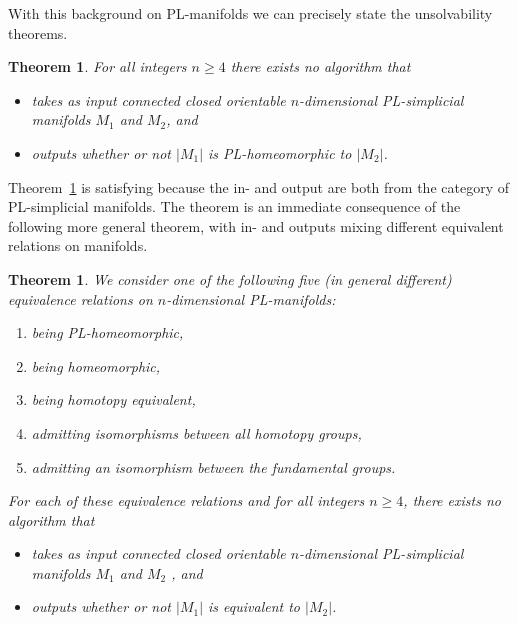 \documentclass[a4paper, reqno]{amsart}
\newtheorem{theorem}[proposition]{Theorem}
\theoremstyle{definition}
\theoremstyle{remark}
\newcommand{\comm}[2]{%
  {\color{red}#1: #2}}
\renewcommand{\~}{\nobreak\ }
\begin{document}
With this background on PL-manifolds we can precisely state the unsolvability theorems.

\begin{theorem}
\label{thm:main_PL_input_and_output}
For all integers $n\geq4$ there exists no algorithm that 
\begin{itemize}
    \item takes as input connected closed orientable $n$-dimensional PL-simplicial manifolds  $M_1$ and $M_2$, and 
    \item outputs whether or not $|M_1|$ is PL-homeomorphic to $|M_2|$.
\end{itemize}
\end{theorem}

Theorem\~\ref{thm:main_PL_input_and_output} is satisfying because the in- and output are both from the category of PL-simplicial manifolds. 
The theorem is an immediate consequence of the following more general theorem,  with in- and outputs mixing different equivalent relations on manifolds.

\begin{theorem}
\label{thm:main_triangulation_input_and_arbitrary_output}
We consider one of the following five (in general different) equivalence relations on 
$n$-dimensional PL-manifolds:
\begin{enumerate}
    \item being PL-homeomorphic,
    \item being homeomorphic,
    \item being homotopy equivalent,
    \item admitting isomorphisms between all homotopy groups,
    \item admitting an isomorphism between the fundamental groups.
\end{enumerate}
For each of these equivalence relations and for all integers $n\geq4$, there exists no algorithm that 
\begin{itemize}
    \item takes as input connected closed orientable $n$-dimensional PL-simplicial manifolds $M_1$ and $M_2$%
    , and %
    \item outputs whether or not $|M_1|$ is equivalent to $|M_2|$.
\end{itemize}
\end{theorem}
\end{document}
